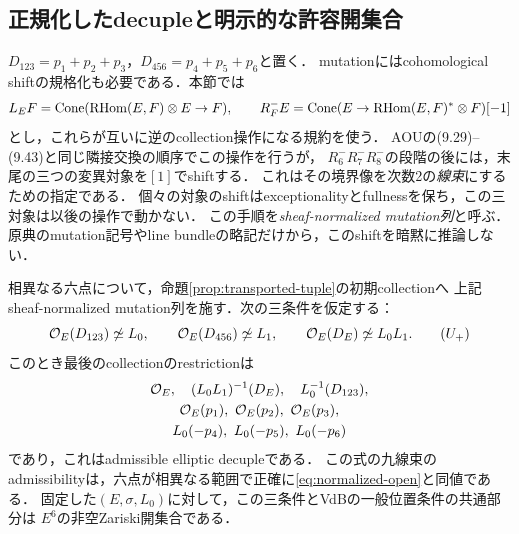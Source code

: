 \subsection{正規化したdecupleと明示的な許容開集合}
$D_{123}=p_1+p_2+p_3$，$D_{456}=p_4+p_5+p_6$と置く．
mutationにはcohomological shiftの規格化も必要である．本節では
\begin{equation}\label{eq:mutation-shift-normalization}
 L_EF=\operatorname{Cone}(\operatorname{RHom}(E,F)\otimes E\to F),\qquad
 R_F^-E=\operatorname{Cone}(E\to\operatorname{RHom}(E,F)^*\otimes F)[-1]
\end{equation}
とし，これらが互いに逆のcollection操作になる規約を使う．
AOUの(9.29)--(9.43)と同じ隣接交換の順序でこの操作を行うが，
$R_6^-R_7^-R_8^-$の段階の後には，末尾の三つの変異対象を$[1]$でshiftする．
これはその境界像を次数2の\emph{線束}にするための指定である．
個々の対象のshiftはexceptionalityとfullnessを保ち，この三対象は以後の操作で動かない．
この手順を\emph{sheaf-normalized mutation列}と呼ぶ．
原典のmutation記号やline bundleの略記だけから，このshiftを暗黙に推論しない．
\begin{proposition}\label{prop:normalized-admissible}
相異なる六点について，命題\ref{prop:transported-tuple}の初期collectionへ
上記sheaf-normalized mutation列を施す．次の三条件を仮定する：
\begin{equation}\label{eq:normalized-open}
 \mathcal O_E(D_{123})\not\simeq L_0,\qquad
 \mathcal O_E(D_{456})\not\simeq L_1,\qquad
 \mathcal O_E(D_E)\not\simeq L_0L_1.
 \tag{$U_+$}
\end{equation}
このとき最後のcollectionのrestrictionは
\begin{equation}\label{eq:normalized-decuple}
\begin{gathered}
 \mathcal O_E,\quad (L_0L_1)^{-1}(D_E),\quad L_0^{-1}(D_{123}),\\
 \mathcal O_E(p_1),\ \mathcal O_E(p_2),\ \mathcal O_E(p_3),\\
 L_0(-p_4),\ L_0(-p_5),\ L_0(-p_6)
\end{gathered}
\end{equation}
であり，これはadmissible elliptic decupleである．
この式の九線束のadmissibilityは，六点が相異なる範囲で正確に\eqref{eq:normalized-open}と同値である．
固定した$(E,\sigma,L_0)$に対して，この三条件とVdBの一般位置条件の共通部分は
$E^6$の非空Zariski開集合である．
\end{proposition}
